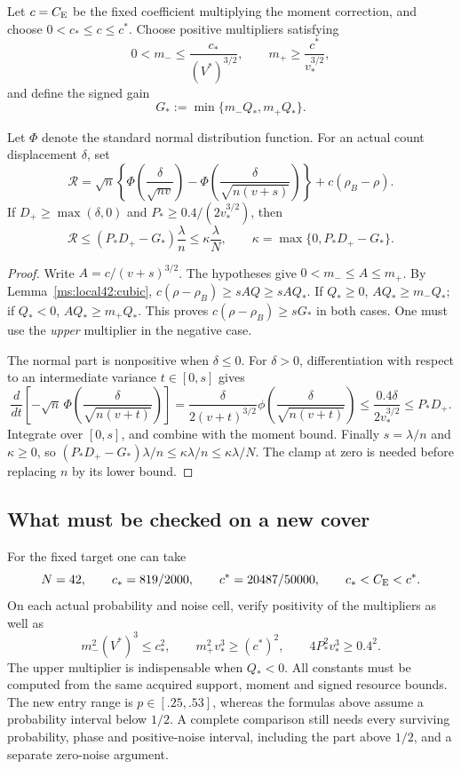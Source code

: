 Let $c=C_{\mathrm E}$ be the fixed coefficient multiplying the moment correction,
and choose $0<c_*\le c\le c^*$. Choose positive multipliers satisfying
\[
        0<m_-\le\frac{c_*}{(V^*)^{3/2}},\qquad
        m_+\ge\frac{c^*}{v_*^{3/2}},
\]
and define the signed gain
\begin{equation}\label{ms:local42:gain}
             G_*:=\min\{m_-Q_*,m_+Q_*\}.
\end{equation}

\begin{proposition}\label{ms:local42:repair}
Let $\Phi$ denote the standard normal distribution function. For an actual
count displacement $\delta$, set
\[
 \mathcal R=\sqrt n\left\{
 \Phi\!\left(\frac{\delta}{\sqrt{nv}}\right)
 -\Phi\!\left(\frac{\delta}{\sqrt{n(v+s)}}\right)\right\}
                         +c(\rho_B-\rho).
\]
If $D_+\ge\max(\delta,0)$ and $P_*\ge 0.4/(2v_*^{3/2})$, then
\begin{equation}\label{ms:local42:repair_bound}
 \mathcal R\le(P_*D_+-G_*)\frac{\lambda}{n}
 \le \kappa\frac{\lambda}{N},\qquad
 \kappa=\max\{0,P_*D_+-G_*\}.
\end{equation}
\end{proposition}
\begin{proof}
Write $A=c/(v+s)^{3/2}$. The hypotheses give
$0<m_-\le A\le m_+$. By Lemma~\ref{ms:local42:cubic},
$c(\rho-\rho_B)\ge sAQ\ge sAQ_*$.
If $Q_*\ge0$, $AQ_*\ge m_-Q_*$; if $Q_*<0$,
$AQ_*\ge m_+Q_*$. This proves $c(\rho-\rho_B)\ge sG_*$
in both cases. One must use the \emph{upper} multiplier in the negative
case.

The normal part is nonpositive when $\delta\le0$.
For $\delta>0$, differentiation with respect to an intermediate variance
$t\in[0,s]$ gives
\[
 \frac{d}{dt}\left[-\sqrt n\,
 \Phi\!\left(\frac{\delta}{\sqrt{n(v+t)}}\right)\right]
 =\frac{\delta}{2(v+t)^{3/2}}
   \phi\!\left(\frac{\delta}{\sqrt{n(v+t)}}\right)
 \le\frac{0.4\delta}{2v_*^{3/2}}\le P_*D_+.
\]
Integrate over $[0,s]$, and combine with the moment bound.
Finally $s=\lambda/n$ and $\kappa\ge0$, so
$(P_*D_+-G_*)\lambda/n\le\kappa\lambda/n\le\kappa\lambda/N$.
The clamp at zero is needed before replacing $n$ by its lower bound.
\end{proof}

\subsection{What must be checked on a new cover}
For the fixed target one can take
\[
 N=42,\qquad c_*=819/2000,\qquad c^*=20487/50000,
 \qquad c_*<C_{\mathrm E}<c^*.
\]
On each actual probability and noise cell, verify positivity of the
multipliers as well as
\[
 m_-^2(V^*)^3\le c_*^2,\qquad
 m_+^2v_*^3\ge(c^*)^2,\qquad 4P_*^2v_*^3\ge0.4^2.
\]
The upper multiplier is indispensable when $Q_*<0$. All constants must
be computed from the same acquired support, moment and signed resource
bounds. The new entry range is $p\in[.25,.53]$, whereas the formulas above
assume a probability interval below $1/2$. A complete comparison still
needs every surviving probability, phase and positive-noise interval,
including the part above $1/2$, and a separate zero-noise argument.

